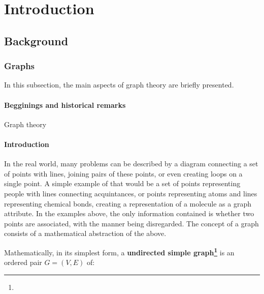\chapter{Introduction} \label{introduction}

\section{Background}

\subsection{Graphs}

In this subsection, the main aspects of graph theory are briefly presented.

\subsubsection{Begginings and historical remarks}

Graph theory

\subsubsection{Introduction}

In the real world, many problems can be described by a diagram connecting a set of points with
lines, joining pairs of these points, or even creating loops on a single point. A simple example
of that would be a set of points representing people with lines connecting acquintances, or
points representing atoms and lines representing chemical bonds, creating a representation of
a molecule as a graph attribute. In the examples above, the only information contained is whether
two points are associated, with the manner being disregarded. The concept of a graph consists of
a mathematical abstraction of the above. \cite{book:2008}


\begin{definition} \label{u_simple_graph} Mathematically, in its simplest form, a
\textbf{undirected simple graph\footnote{}} is an ordered pair $G=(V, E)$ of:
\end{definition}

